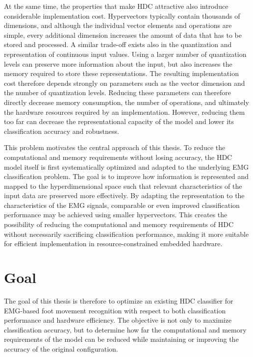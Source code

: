 At the same time, the properties that make \ac{HDC} attractive also introduce considerable implementation cost. Hypervectors typically contain thousands of dimensions, and although the individual vector elements and operations are simple, every additional dimension increases the amount of data that has to be stored and processed. A similar trade-off exists also in the quantization and representation of continuous input values. Using a larger number of quantization levels can preserve more information about the input, but also increases the memory required to store these representations. The resulting implementation cost therefore depends strongly on parameters such as the vector dimension and the number of quantization levels. Reducing these parameters can therefore directly decrease memory consumption, the number of operations, and ultimately the hardware resources required by an implementation. However, reducing them too far can decrease the representational capacity of the model and lower its classification accuracy and robustness.

This problem motivates the central approach of this thesis. To reduce the computational and memory requirements without losing accuracy, the HDC model itself is first systematically optimized and adapted to the underlying EMG classification problem. The goal is to improve how information is represented and mapped to the hyperdimensional space such that relevant characteristics of the input data are preserved more effectively. By adapting the representation to the characteristics of the EMG signals, comparable or even improved classification performance may be achieved using smaller hypervectors. This creates the possibility of reducing the computational and memory requirements of HDC without necessarily sacrificing classification performance, making it more suitable for efficient implementation in resource-constrained embedded hardware.

\section{Goal}

The goal of this thesis is therefore to optimize an existing \ac{HDC} classifier for EMG-based foot movement recognition with respect to both classification performance and hardware efficiency. The objective is not only to maximize classification accuracy, but to determine how far the computational and memory requirements of the model can be reduced while maintaining or improving the accuracy of the original configuration.\\

